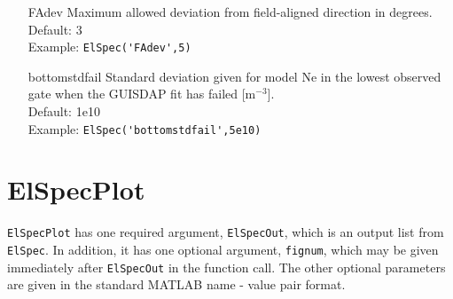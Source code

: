 \documentclass[12pt,a4paper]{report}
\begin{document}
\begin{itemize}
\item[FAdev] Maximum allowed deviation from field-aligned direction in degrees. \\
Default: 3\\
Example: \verb|ElSpec('FAdev',5)|

\item[bottomstdfail] Standard deviation given for model Ne in the lowest observed gate when the GUISDAP fit has failed [m$^{-3}$].\\
Default: 1e10\\
Example: \verb|ElSpec('bottomstdfail',5e10)|


\end{itemize}



\section{ElSpecPlot}

\verb|ElSpecPlot| has one required argument, \verb|ElSpecOut|, which is an output list from \verb|ElSpec|. In addition, it has one optional argument, \verb|fignum|, which may be given immediately after \verb|ElSpecOut| in the function call. The other optional parameters are given in the standard MATLAB name - value pair format. 
\end{document}
